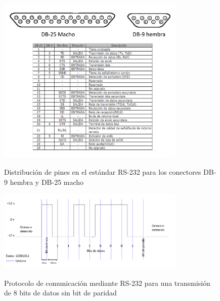 \documentclass[letterpaper,openright,12pt]{book}
\begin{document}
\begin{figure}
\begin{center}
\includegraphics[width=0.8\textwidth]{figures/terminalesrs232.png}
\caption{Distribución de pines en el estándar RS-232 para los conectores DB-9 hembra y DB-25 macho}
\centering
\label{fig:232pinout}
\end{center}
\end{figure} 

\begin{figure}
\begin{center}
\includegraphics[width=0.8\textwidth]{figures/comunicacionrs232.png}
\caption{Protocolo de comunicación mediante RS-232 para una transmisión de 8 bits de datos sin bit de paridad}
\centering
\label{fig:232communication}
\end{center}
\end{figure} 
\end{document}

